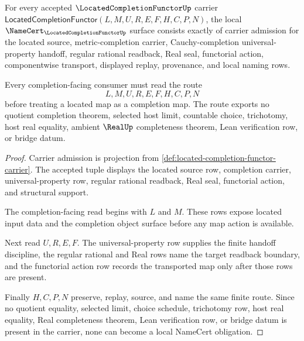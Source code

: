\begin{theorem}
\label{thm:located-completion-functor-namecert-obligations}
For every accepted $\LocatedCompletionFunctorUp$ carrier $\mathsf{LocatedCompletionFunctor}(L,M,U,R,E,F,H,C,P,N)$, the local $\NameCert_{\LocatedCompletionFunctorUp}$ surface consists exactly of carrier admission for the located source, metric-completion carrier, Cauchy-completion universal-property handoff, regular rational readback, Real seal, functorial action, componentwise transport, displayed replay, provenance, and local naming rows.

Every completion-facing consumer must read the route
$$
L,M,U,R,E,F,H,C,P,N
$$
before treating a located map as a completion map. The route exports no quotient completion theorem, selected host limit, countable choice, trichotomy, host real equality, ambient $\RealUp$ completeness theorem, Lean verification row, or bridge datum.
\end{theorem}
\begin{proof}
Carrier admission is projection from \autoref{def:located-completion-functor-carrier}. The accepted tuple displays the located source row, completion carrier, universal-property row, regular rational readback, Real seal, functorial action, and structural support.

The completion-facing read begins with $L$ and $M$. These rows expose located input data and the completion object surface before any map action is available.

Next read $U,R,E,F$. The universal-property row supplies the finite handoff discipline, the regular rational and Real rows name the target readback boundary, and the functorial action row records the transported map only after those rows are present.

Finally $H,C,P,N$ preserve, replay, source, and name the same finite route. Since no quotient equality, selected limit, choice schedule, trichotomy row, host real equality, Real completeness theorem, Lean verification row, or bridge datum is present in the carrier, none can become a local NameCert obligation.
\end{proof}

